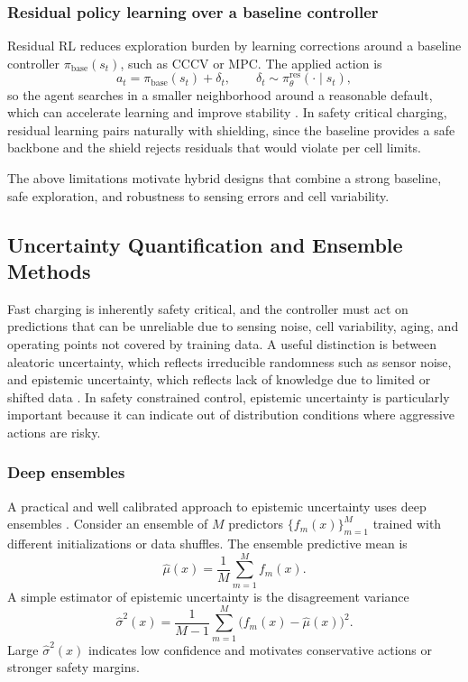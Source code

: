 \documentclass[%
 aip,
 amsmath,amssymb,
reprint, onecolumn %
]{revtex4-1}
\begin{document}
\subsubsection{Residual policy learning over a baseline controller}
Residual RL reduces exploration burden by learning corrections around a baseline controller $\pi_{\text{base}}(s_t)$, such as CCCV or MPC. The applied action is
\begin{equation}
a_t
=
\pi_{\text{base}}(s_t) + \delta_t,
\qquad
\delta_t \sim \pi_{\theta}^{\text{res}}(\cdot \mid s_t),
\label{eq_residual_policy}
\end{equation}
so the agent searches in a smaller neighborhood around a reasonable default, which can accelerate learning and improve stability \cite{johannink2019residual}. In safety critical charging, residual learning pairs naturally with shielding, since the baseline provides a safe backbone and the shield rejects residuals that would violate per cell limits.

The above limitations motivate hybrid designs that combine a strong baseline, safe exploration, and robustness to sensing errors and cell variability.


\subsection{Uncertainty Quantification and Ensemble Methods}
\label{sec_uq_ensembles}

Fast charging is inherently safety critical, and the controller must act on predictions that can be unreliable due to sensing noise, cell variability, aging, and operating points not covered by training data. A useful distinction is between aleatoric uncertainty, which reflects irreducible randomness such as sensor noise, and epistemic uncertainty, which reflects lack of knowledge due to limited or shifted data \cite{kendall2017uncertainties}. In safety constrained control, epistemic uncertainty is particularly important because it can indicate out of distribution conditions where aggressive actions are risky.

\subsubsection{Deep ensembles}
A practical and well calibrated approach to epistemic uncertainty uses deep ensembles \cite{lakshminarayanan2017simple}. Consider an ensemble of $M$ predictors $\{f_m(x)\}_{m=1}^{M}$ trained with different initializations or data shuffles. The ensemble predictive mean is
\begin{equation}
\hat{\mu}(x)=\frac{1}{M}\sum_{m=1}^{M} f_m(x).
\label{eq_deep_ens_mean}
\end{equation}
A simple estimator of epistemic uncertainty is the disagreement variance
\begin{equation}
\hat{\sigma}^2(x)=\frac{1}{M-1}\sum_{m=1}^{M}\bigl(f_m(x)-\hat{\mu}(x)\bigr)^2.
\label{eq_deep_ens_var}
\end{equation}
Large $\hat{\sigma}^2(x)$ indicates low confidence and motivates conservative actions or stronger safety margins.
\end{document}
